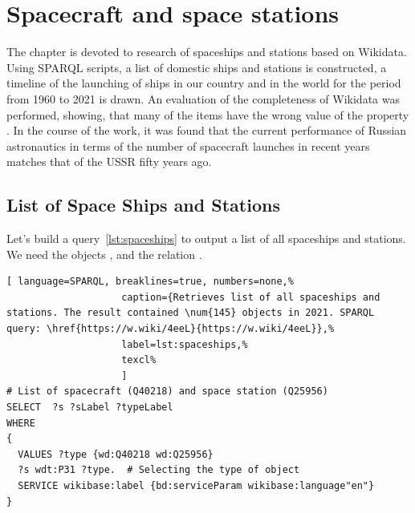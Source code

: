 
\setchapterpreamble[u]{\margintoc}
\chapter{Spacecraft and space stations\protect\footnotemark}

The chapter is devoted to research of spaceships and stations based on Wikidata. 
Using SPARQL scripts, a list of domestic ships and stations is constructed, 
a timeline of the launching of ships in our country and in the world for the period from 1960 to 2021 is drawn. 
An evaluation of the completeness of Wikidata was performed, showing, 
that many of the items have the wrong value of the property 
. In the course of the work, it was found that the current performance of Russian astronautics in terms of the number of spacecraft launches in recent years matches that of the USSR fifty years ago. 

\section{List of Space Ships and Stations}
Let's build a query~\ref{lst:spaceships} to output a list of all spaceships and stations. 
We need the objects , 
 and the relation . 

\begin{lstlisting}[ language=SPARQL, breaklines=true, numbers=none,%
                    caption={Retrieves list of all spaceships and stations. The result contained \num{145} objects in 2021. SPARQL query: \href{https://w.wiki/4eeL}{https://w.wiki/4eeL}},%
                    label=lst:spaceships,%
                    texcl%
                    ]
# List of spacecraft (Q40218) and space station (Q25956)
SELECT  ?s ?sLabel ?typeLabel
WHERE
{
  VALUES ?type {wd:Q40218 wd:Q25956}
  ?s wdt:P31 ?type.  # Selecting the type of object
  SERVICE wikibase:label {bd:serviceParam wikibase:language"en"}
}
\end{lstlisting}%

